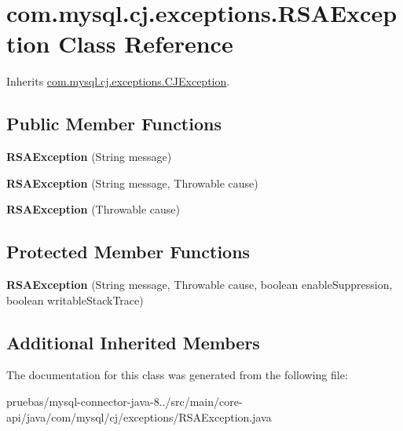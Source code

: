 \hypertarget{classcom_1_1mysql_1_1cj_1_1exceptions_1_1_r_s_a_exception}{}\section{com.\+mysql.\+cj.\+exceptions.\+R\+S\+A\+Exception Class Reference}
\label{classcom_1_1mysql_1_1cj_1_1exceptions_1_1_r_s_a_exception}


Inherits \mbox{\hyperlink{classcom_1_1mysql_1_1cj_1_1exceptions_1_1_c_j_exception}{com.\+mysql.\+cj.\+exceptions.\+C\+J\+Exception}}.

\subsection*{Public Member Functions}
\begin{DoxyCompactItemize}
\item 
\mbox{\label{classcom_1_1mysql_1_1cj_1_1exceptions_1_1_r_s_a_exception_ae7cb98716a5af515d8a9d8f6fc00fb1a}} 
{\bfseries R\+S\+A\+Exception} (String message)
\item 
\mbox{\label{classcom_1_1mysql_1_1cj_1_1exceptions_1_1_r_s_a_exception_a7d89760310f75054b72b507271a44fb3}} 
{\bfseries R\+S\+A\+Exception} (String message, Throwable cause)
\item 
\mbox{\label{classcom_1_1mysql_1_1cj_1_1exceptions_1_1_r_s_a_exception_ac627e001f7ede81a3a999276fdbec558}} 
{\bfseries R\+S\+A\+Exception} (Throwable cause)
\end{DoxyCompactItemize}
\subsection*{Protected Member Functions}
\begin{DoxyCompactItemize}
\item 
\mbox{\label{classcom_1_1mysql_1_1cj_1_1exceptions_1_1_r_s_a_exception_a5d442d55f6d35b5e22036dca219f751a}} 
{\bfseries R\+S\+A\+Exception} (String message, Throwable cause, boolean enable\+Suppression, boolean writable\+Stack\+Trace)
\end{DoxyCompactItemize}
\subsection*{Additional Inherited Members}


The documentation for this class was generated from the following file\+:\begin{DoxyCompactItemize}
\item 
pruebas/mysql-\/connector-\/java-\/8../src/main/core-\/api/java/com/mysql/cj/exceptions/R\+S\+A\+Exception.\+java\end{DoxyCompactItemize}
